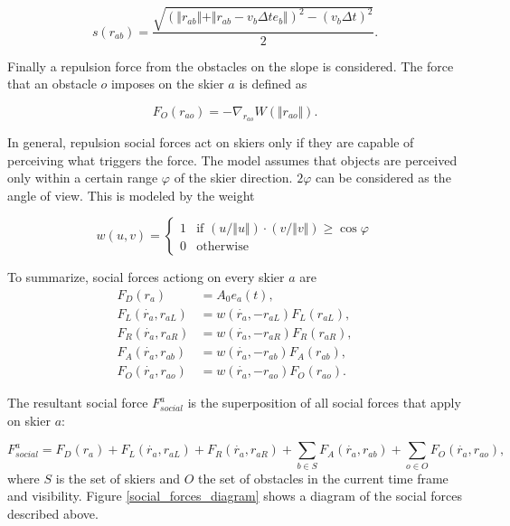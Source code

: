 \documentclass[12pt,a4paper,twoside]{book}
\begin{document}
\begin{equation}\label{skier_s}
s(r_{ab})=\frac{\sqrt{(\Vert r_{ab} \Vert + \Vert r_{ab}-v_b \Delta t e_b \Vert )^2-(v_b \Delta t)^2}}{2}.
\end{equation}

Finally a repulsion force from the obstacles on the slope is considered. The force that an obstacle $o$ imposes on the skier $a$ is defined as

\begin{equation}\label{obstacle_force}
F_O(r_{ao})=-\nabla_{r_{ao}}W(\Vert r_{ao} \Vert ).
\end{equation}

In general, repulsion social forces act on skiers only if they are capable of perceiving what triggers the force. The model assumes that objects are perceived only within a certain range $\varphi$ of the skier direction. $2\varphi$ can be considered as the angle of view. This is modeled by the weight

\begin{equation}\label{visibility}
w(u,v)=\begin{cases}
  1 & \text{if $(u/\Vert u \Vert)\cdot (v/\Vert v \Vert) \geq \cos \varphi$} \\
  0 & \text{otherwise }
  \end{cases}
\end{equation}

To summarize, social forces actiong on every skier $a$ are
\begin{align}\label{social_forces_tb}
F_D(r_a)&=A_0 e_a(t),\\
F_L(\dot{r_a},r_{aL})&=w(\dot{r_a},-r_{aL})F_L(r_{aL}),\\
F_R(\dot{r_a},r_{aR})&=w(\dot{r_a},-r_{aR})F_R(r_{aR}),\\
F_A(\dot{r_a},r_{ab})&=w(\dot{r_a},-r_{ab})F_A(r_{ab}),\\
F_O(\dot{r_a},r_{ao})&=w(\dot{r_a},-r_{ao})F_O(r_{ao}).
\end{align}

The resultant social force $F^a_{social}$ is the superposition of all social forces that apply on skier $a$:

\begin{equation}
F^a_{social}=F_D(r_a)+F_L(\dot{r_a},r_{aL})+F_R(\dot{r_a},r_{aR})+\sum_{b\in S} F_A(\dot{r_a},r_{ab})+\sum_{o \in O} F_O(\dot{r_a},r_{ao}),\nonumber
\end{equation}
where $S$ is the set of skiers and $O$ the set of obstacles in the current time frame and visibility. Figure \ref{social_forces_diagram} shows a diagram of the social forces described above.
\end{document}
